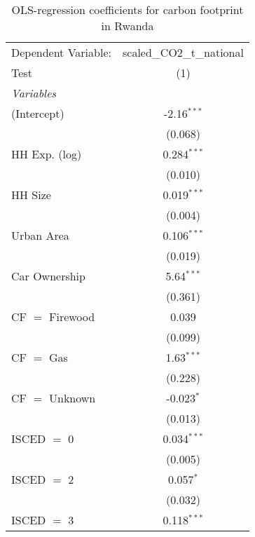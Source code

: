 
\begin{table}[htbp!]
   \centering
   \small
   \begin{adjustbox}{width = 1\textwidth, max height = 0.95\textheight, center}
      \begin{threeparttable}[b]
         \caption{\label{tab:OLS_2_RWA} OLS-regression coefficients for carbon footprint in Rwanda}
         \begin{tabular}{lc}
            \tabularnewline \midrule \midrule
            Dependent Variable: & scaled\_CO2\_t\_national\\     
            Test                & (1)\\  
            \midrule
            \emph{Variables}\\
            (Intercept)         & -2.16$^{***}$\\   
                                & (0.068)\\   
            HH Exp. (log)       & 0.284$^{***}$\\   
                                & (0.010)\\   
            HH Size             & 0.019$^{***}$\\   
                                & (0.004)\\   
            Urban Area          & 0.106$^{***}$\\   
                                & (0.019)\\   
            Car Ownership       & 5.64$^{***}$\\   
                                & (0.361)\\   
            CF $=$ Firewood     & 0.039\\   
                                & (0.099)\\   
            CF $=$ Gas          & 1.63$^{***}$\\   
                                & (0.228)\\   
            CF $=$ Unknown      & -0.023$^{*}$\\   
                                & (0.013)\\   
            ISCED $=$ 0         & 0.034$^{***}$\\   
                                & (0.005)\\   
            ISCED $=$ 2         & 0.057$^{*}$\\   
                                & (0.032)\\   
            ISCED $=$ 3         & 0.118$^{***}$\\   

\end{tabular}
\end{threeparttable}
\end{adjustbox}
\end{table}
